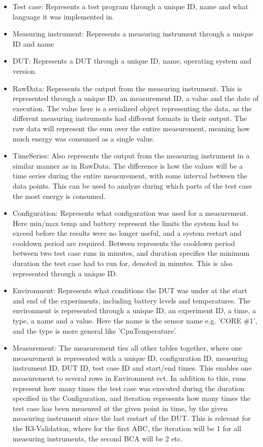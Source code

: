 \begin{itemize}
    \item Test case: Represents a test program through a unique ID, name and what language it was implemented in.
    \item Measuring instrument: Represents a measuring instrument through a unique ID and name
    \item DUT: Represents a DUT through a unique ID, name, operating system and version. 
    \item RawData: Represents the output from the measuring instrument. This is represented through a unique ID, an measurement ID, a value and the date of execution. The value here is a serialized object representing the data, as the different measuring instruments had different formats in their output. The raw data will represent the sum over the entire measurement, meaning how much energy was consumed as a single value.
    \item TimeSeries: Also represents the output from the measuring instrument in a similar manner as in RawData. The difference is how the values will be a time series during the entire measurement, with some interval between the data points. This can be used to analyze during which parts of the test case the most energy is consumed.
    \item Configuration: Represents what configuration was used for a measurement. Here min/max temp and battery represent the limits the system had to exceed before the results were no longer useful, and a system restart and cooldown period are required. Between represents the cooldown period between two test case runs in minutes, and duration specifies the minimum duration the test case had to run for, denoted in minutes. This is also represented through a unique ID.
    \item Environment: Represents what conditions the DUT was under at the start and end of the experiments, including battery levels and temperatures. The environment is represented through a unique ID, an experiment ID, a time, a type, a name and a value. Here the name is the sensor name e.g. 'CORE \#1', and the type is more general like 'CpuTemperature'.
    \item Measurement: The measurement ties all other tables together, where one measurement is represented with a unique ID, configuration ID, measuring instrument ID, DUT ID, test case ID and start/end times. This enables one measurement to several rows in Environment ect. In addition to this, runs represent how many times the test case was executed during the duration specified in the Configuration, and iteration represents how many times the test case has been measured at the given point in time, by the given measuring instrument since the last restart of the DUT. This is relevant for the R3-Validation, where for the first ABC, the iteration will be 1 for all measuring instruments, the second BCA will be 2 etc.
\end{itemize}

